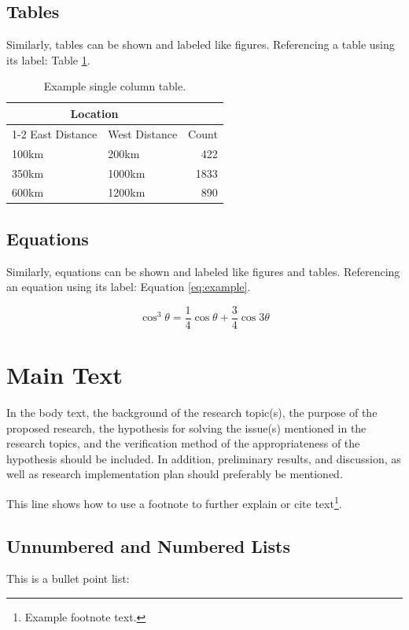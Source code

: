 \documentclass[
	a4paper, %
	10pt, %
]{LTJournalArticle}
\begin{document}
\subsection{Tables}
Similarly, tables can be shown and labeled like figures. Referencing a table using its label: Table \ref{tab:distcounts}.

\begin{table} %
	\caption{Example single column table.}
	\centering
	\begin{tabular}{l l r}
		\toprule
		\multicolumn{2}{c}{Location} \\
		\cmidrule(r){1-2}
		East Distance & West Distance & Count \\
		\midrule
		100km & 200km & 422 \\
		350km & 1000km & 1833 \\
		600km & 1200km & 890 \\
		\bottomrule
	\end{tabular}
	\label{tab:distcounts}
\end{table}

\subsection{Equations}
Similarly, equations can be shown and labeled like figures and tables. Referencing an equation using its label: Equation \ref{eq:example}.

\begin{equation}
	\cos^3 \theta =\frac{1}{4}\cos\theta+\frac{3}{4}\cos 3\theta
	\label{eq:example}
\end{equation}


\section{Main Text}
In the body text, the background of the research topic(s), the purpose of the proposed research, the hypothesis for solving the issue(s) mentioned in the research topics, and the verification method of the appropriateness of the hypothesis should be included. In addition, preliminary results, and discussion, as well as research implementation plan should preferably be mentioned.

This line shows how to use a footnote to further explain or cite text\footnote{Example footnote text.}.

\subsection{Unnumbered and Numbered Lists}
This is a bullet point list:
\end{document}
